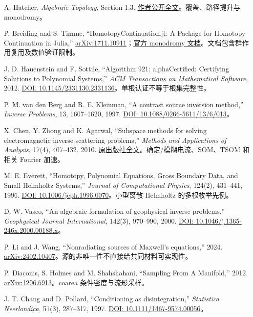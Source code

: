 \begin{enumerate}[label={[R\arabic*]},leftmargin=3.1em,itemsep=7pt]
\item A. Hatcher, \emph{Algebraic Topology}, Section 1.3. \href{https://pi.math.cornell.edu/~hatcher/AT/AT.pdf}{作者公开全文}。覆盖、路径提升与 monodromy。
\item P. Breiding and S. Timme, ``HomotopyContinuation.jl: A Package for Homotopy Continuation in Julia,'' \href{https://arxiv.org/abs/1711.10911}{arXiv:1711.10911}；\href{https://www.juliahomotopycontinuation.org/HomotopyContinuation.jl/stable/monodromy/}{官方 monodromy 文档}。文档包含群作用复用及数值验证限制。
\item J. D. Hauenstein and F. Sottile, ``Algorithm 921: alphaCertified: Certifying Solutions to Polynomial Systems,'' \emph{ACM Transactions on Mathematical Software}, 2012. \href{https://doi.org/10.1145/2331130.2331136}{DOI: 10.1145/2331130.2331136}。单根认证不等于根集完整性。
\item P. M. van den Berg and R. E. Kleinman, ``A contrast source inversion method,'' \emph{Inverse Problems}, 13, 1607--1620, 1997. \href{https://doi.org/10.1088/0266-5611/13/6/013}{DOI: 10.1088/0266-5611/13/6/013}。
\item X. Chen, Y. Zhong and K. Agarwal, ``Subspace methods for solving electromagnetic inverse scattering problems,'' \emph{Methods and Applications of Analysis}, 17(4), 407--432, 2010. \href{https://archive.intlpress.com/site/pub/files/_fulltext/journals/maa/2010/0017/0004/MAA-2010-0017-0004-a006.pdf}{原出版社全文}。确定/模糊电流、SOM、TSOM 和相关 Fourier 加速。
\item M. E. Everett, ``Homotopy, Polynomial Equations, Gross Boundary Data, and Small Helmholtz Systems,'' \emph{Journal of Computational Physics}, 124(2), 431--441, 1996. \href{https://doi.org/10.1006/jcph.1996.0070}{DOI: 10.1006/jcph.1996.0070}。小型离散 Helmholtz 的多根枚举先例。
\item D. W. Vasco, ``An algebraic formulation of geophysical inverse problems,'' \emph{Geophysical Journal International}, 142(3), 970--990, 2000. \href{https://doi.org/10.1046/j.1365-246x.2000.00188.x}{DOI: 10.1046/j.1365-246x.2000.00188.x}。
\item P. Li and J. Wang, ``Nonradiating sources of Maxwell's equations,'' 2024. \href{https://arxiv.org/abs/2402.10407}{arXiv:2402.10407}。源的非唯一性不直接给共同材料可实现性。
\item P. Diaconis, S. Holmes and M. Shahshahani, ``Sampling From A Manifold,'' 2012. \href{https://arxiv.org/abs/1206.6913}{arXiv:1206.6913}。coarea 条件密度与流形采样。
\item J. T. Chang and D. Pollard, ``Conditioning as disintegration,'' \emph{Statistica Neerlandica}, 51(3), 287--317, 1997. \href{https://doi.org/10.1111/1467-9574.00056}{DOI: 10.1111/1467-9574.00056}。

\end{enumerate}
